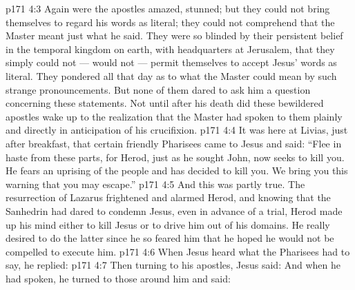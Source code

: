 \vs p171 4:3 Again were the apostles amazed, stunned; but they could not bring themselves to regard his words as literal; they could not comprehend that the Master meant just what he said. They were so blinded by their persistent belief in the temporal kingdom on earth, with headquarters at Jerusalem, that they simply could not --- would not --- permit themselves to accept Jesus’ words as literal. They pondered all that day as to what the Master could mean by such strange pronouncements. But none of them dared to ask him a question concerning these statements. Not until after his death did these bewildered apostles wake up to the realization that the Master had spoken to them plainly and directly in anticipation of his crucifixion.
\vs p171 4:4 \pc It was here at Livias, just after breakfast, that certain friendly Pharisees came to Jesus and said: “Flee in haste from these parts, for Herod, just as he sought John, now seeks to kill you. He fears an uprising of the people and has decided to kill you. We bring you this warning that you may escape.”
\vs p171 4:5 And this was partly true. The resurrection of Lazarus frightened and alarmed Herod, and knowing that the Sanhedrin had dared to condemn Jesus, even in advance of a trial, Herod made up his mind either to kill Jesus or to drive him out of his domains. He really desired to do the latter since he so feared him that he hoped he would not be compelled to execute him.
\vs p171 4:6 When Jesus heard what the Pharisees had to say, he replied: 
\vs p171 4:7 Then turning to his apostles, Jesus said:  And when he had spoken, he turned to those around him and said: 
